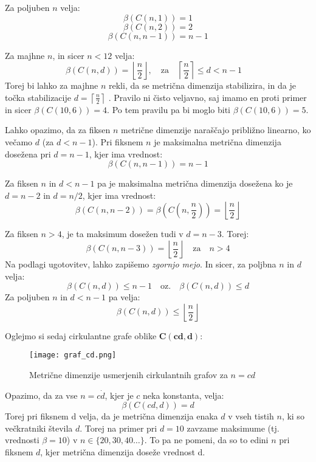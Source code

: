 \documentclass[a4paper,12pt]{article}
\theoremstyle{definition}
\theoremstyle{remark}
\theoremstyle{definition}
\begin{document}
Za poljuben $n$ velja:
\[
    \beta(C(n, 1)) = 1
\]
\[
    \beta(C(n, 2)) = 2
\]
\[
    \beta(C(n, n-1)) = n-1
\]

\noindent
Za majhne $n$, in sicer $n < 12$ velja:
\[
    \beta(C(n, d)) = \left\lfloor \frac{n}{2} \right\rfloor, \quad \text{za} \quad \left\lceil \frac{n}{2} \right\rceil \leq d < n-1 \quad
\]
\noindent
Torej bi lahko za majhne $n$ rekli, da se metrična dimenzija stabilizira, in da je točka stabilizacije $ d = \left\lceil \frac{n}{2} \right\rceil$ .
Pravilo ni čisto veljavno, saj imamo en proti primer in sicer $\beta(C(10, 6)) = 4$. Po tem pravilu pa bi moglo biti $\beta(C(10, 6)) = 5$. 
\\

\par 
\noindent
Lahko opazimo, da za fiksen $n$ metrične dimenzije naraščajo približno linearno, ko večamo $d$ (za $d < n-1$).
Pri fiksnem $n$ je maksimalna metrična dimenzija dosežena pri $d = n - 1$, kjer ima vrednost: 
\[
    \beta(C(n, n-1)) = n-1
\]

\noindent
Za fiksen $n$ in $d < n - 1$ pa je maksimalna metrična dimenzija dosežena ko je $d = n -2$ in $d = n/2$, 
kjer ima vrednost:
\[
    \beta(C(n, n-2)) = \beta\left(C\left(n, \frac{n}{2}\right)\right) = \left\lfloor \frac{n}{2} \right\rfloor
\]

\noindent
Za fiksen $n > 4$, je ta maksimum dosežen tudi v $d = n - 3$. Torej:
\[
    \beta(C(n, n-3)) = \left\lfloor \frac{n}{2} \right\rfloor \quad \text{za} \quad n > 4
\]
\noindent
Na podlagi ugotovitev, lahko zapišemo \textit{zgornjo mejo}. In sicer, za poljbna $n$ in $d$ velja:
\[\beta(C(n,d)) \leq n - 1 \quad \text{oz.} \quad  \beta(C(n,d)) \leq d\]  
\noindent
Za poljuben $n$ in $d < n-1$ pa velja:
\[\beta(C(n ,d)) \leq \left\lfloor \frac{n}{2} \right\rfloor\]

\par
\noindent
Oglejmo si sedaj cirkulantne grafe oblike $\mathbf{C( cd, d )}$:

\begin{figure}[H]  
    \centering
    \texttt{[image: graf\_cd.png]}  
    \caption{Metrične dimenzije usmerjenih cirkulantnih grafov za $n = cd$} 
    \label{fig:screenshot}  
\end{figure}

\noindent
Opazimo, da za vse $n = c \dot d$, kjer je $c$ neka konstanta, velja:
\[
    \beta(C(cd, d)) = d
\]
\noindent
Torej pri fiksnem d velja, da je metrična dimenzija enaka $d$ v vseh tistih $n$, ki so večkratniki števila $d$.
Torej na primer pri $d = 10$ zavzame maksimume (tj. vrednosti $\beta = 10$) v $ n \in \{20, 30, 40 \dots\} $.
To pa ne pomeni, da so to edini $n$ pri fiksnem $d$, kjer metrična dimenzija doseže vrednost d. 
\end{document}
